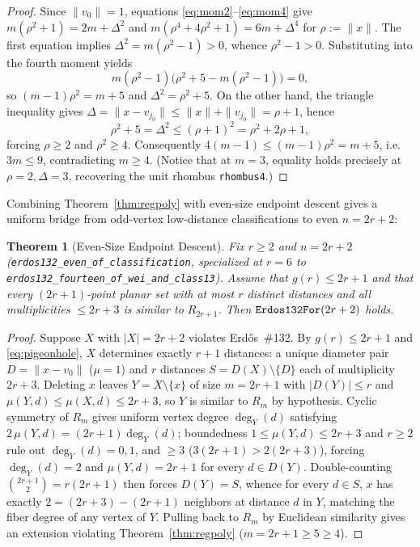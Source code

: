 \documentclass[11pt,reqno]{amsart}
\newtheorem{theorem}{Theorem}[section]
\theoremstyle{definition}
\newcommand{\card}[1]{|#1|}
\begin{document}
\begin{proof}
Since $\|v_0\| = 1$, equations \eqref{eq:mom2}--\eqref{eq:mom4} give $m(\rho^2 + 1) = 2m + \Delta^2$ and $m(\rho^4 + 4\rho^2 + 1) = 6m + \Delta^4$ for $\rho := \|x\|$. The first equation implies $\Delta^2 = m(\rho^2 - 1) > 0$, whence $\rho^2 - 1 > 0$. Substituting into the fourth moment yields
\[
m(\rho^2 - 1)\bigl(\rho^2 + 5 - m(\rho^2 - 1)\bigr) = 0,
\]
so $(m - 1)\rho^2 = m + 5$ and $\Delta^2 = \rho^2 + 5$. On the other hand, the triangle inequality gives $\Delta = \|x - v_{j_0}\| \le \|x\| + \|v_{j_0}\| = \rho + 1$, hence
\[
\rho^2 + 5 = \Delta^2 \le (\rho + 1)^2 = \rho^2 + 2\rho + 1,
\]
forcing $\rho \ge 2$ and $\rho^2 \ge 4$. Consequently $4(m - 1) \le (m - 1)\rho^2 = m + 5$, i.e.\ $3m \le 9$, contradicting $m \ge 4$. (Notice that at $m = 3$, equality holds precisely at $\rho = 2, \Delta = 3$, recovering the unit rhombus \texttt{rhombus4}.)
\end{proof}

Combining Theorem~\ref{thm:regpoly} with even-size endpoint descent gives a uniform bridge from odd-vertex low-distance classifications to even $n = 2r + 2$:

\begin{theorem}[Even-Size Endpoint Descent]\label{thm:even}
Fix $r \ge 2$ and $n = 2r + 2$ (\texttt{erdos132\_even\_of\_classification}, specialized at $r = 6$ to \texttt{erdos132\_fourteen\_of\_wei\_and\_class13}). Assume that $g(r) \le 2r + 1$ and that every $(2r+1)$-point planar set with at most $r$ distinct distances and all multiplicities $\le 2r + 3$ is similar to $R_{2r+1}$. Then $\text{\texttt{Erdos132For}}(2r + 2)$ holds.
\end{theorem}

\begin{proof}
Suppose $X$ with $\card{X} = 2r + 2$ violates Erd\H{o}s~\#132. By $g(r) \le 2r + 1$ and \eqref{eq:pigeonhole}, $X$ determines exactly $r + 1$ distances: a unique diameter pair $D = \|x - v_0\|$ ($\mu = 1$) and $r$ distances $S = D(X) \setminus \{D\}$ each of multiplicity $2r + 3$. Deleting $x$ leaves $Y = X \setminus \{x\}$ of size $m = 2r + 1$ with $\card{D(Y)} \le r$ and $\mu(Y, d) \le \mu(X, d) \le 2r + 3$, so $Y$ is similar to $R_m$ by hypothesis. Cyclic symmetry of $R_m$ gives uniform vertex degree $\deg_Y(d)$ satisfying $2\,\mu(Y, d) = (2r + 1)\deg_Y(d)$; boundedness $1 \le \mu(Y, d) \le 2r + 3$ and $r \ge 2$ rule out $\deg_Y(d) = 0, 1$, and $\ge 3$ ($3(2r+1) > 2(2r+3)$), forcing $\deg_Y(d) = 2$ and $\mu(Y, d) = 2r + 1$ for every $d \in D(Y)$. Double-counting $\binom{2r+1}{2} = r(2r+1)$ then forces $D(Y) = S$, whence for every $d \in S$, $x$ has exactly $2 = (2r+3) - (2r+1)$ neighbors at distance $d$ in $Y$, matching the fiber degree of any vertex of $Y$. Pulling back to $R_m$ by Euclidean similarity gives an extension violating Theorem~\ref{thm:regpoly} ($m = 2r + 1 \ge 5 \ge 4$).
\end{proof}
\end{document}
